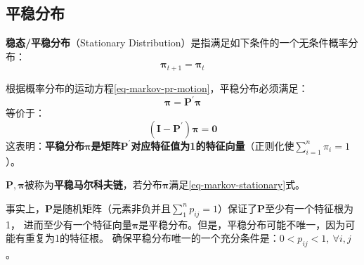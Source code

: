 \subsection{平稳分布}

\begin{definition}
    \textbf{稳态/平稳分布}（Stationary Distribution）是指满足如下条件的一个无条件概率分布：
    \begin{equation*}
        \boldsymbol{\pi}_{t+1} = \boldsymbol{\pi}_t
    \end{equation*}
\end{definition}
根据概率分布的运动方程\ref{eq-markov-pr-motion}，平稳分布必须满足：
\begin{equation}    \label{eq-markov-stationary}
    \boldsymbol{\pi} = \boldsymbol{P}^{\prime}\boldsymbol{\pi}
\end{equation}
等价于：
\begin{equation}
    \left(\boldsymbol{I}-\boldsymbol{P}^{\prime}\right)\boldsymbol{\pi} = \boldsymbol{0}
\end{equation}
这表明：\textbf{平稳分布$\boldsymbol{\pi}$是矩阵$\boldsymbol{P}^{\prime}$对应特征值为1的特征向量}（正则化使$\sum_{i=1}^{n}\pi_i=1$）。

\begin{definition}
    $\boldsymbol{P}, \boldsymbol{\pi}$被称为\textbf{平稳马尔科夫链}，若分布$\boldsymbol{\pi}$满足\ref{eq-markov-stationary}式。
\end{definition}

事实上，$\boldsymbol{P}$是随机矩阵（元素非负并且$\sum_{1}^{n}p_{ij}=1$）保证了$\boldsymbol{P}$至少有一个特征根为1，
进而至少有一个特征向量$\boldsymbol{\pi}$是平稳分布。但是，平稳分布可能不唯一，因为可能有重复为1的特征根。
确保平稳分布唯一的一个充分条件是：$0<p_{i j}<1, ~ \forall i, j$。

